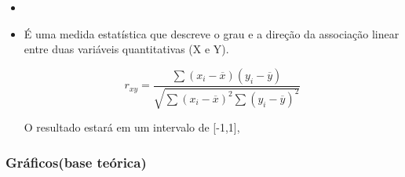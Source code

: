 \documentclass[a4paper,11pt]{article}
\begin{document}
\begin{itemize}
\item[]

    \item É uma medida estatística que descreve o grau e a direção da associação linear entre duas variáveis quantitativas (X e Y).

    \[r_{xy} = \frac{\sum{(x_i - \overline{x})(y_i-\overline{y})}}{\sqrt{\sum (x_i - \overline{x})^2 \sum(y_i-\overline{y})^2}}\]

    O resultado estará em um intervalo de [-1,1], 

\end{itemize}

\subsubsection*{Gráficos(base teórica)} 
\end{document}
